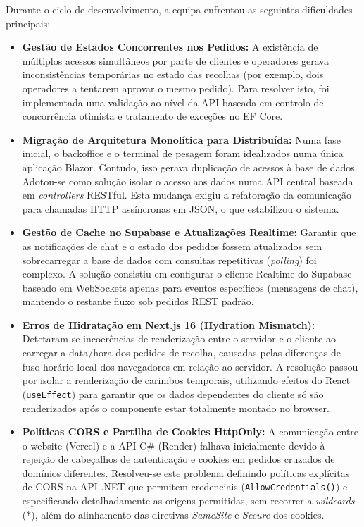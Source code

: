 Durante o ciclo de desenvolvimento, a equipa enfrentou as seguintes dificuldades principais:
\begin{itemize}
    \item \textbf{Gestão de Estados Concorrentes nos Pedidos:} A existência de múltiplos acessos simultâneos por parte de clientes e operadores gerava inconsistências temporárias no estado das recolhas (por exemplo, dois operadores a tentarem aprovar o mesmo pedido). Para resolver isto, foi implementada uma validação ao nível da API baseada em controlo de concorrência otimista e tratamento de exceções no EF Core.
    \item \textbf{Migração de Arquitetura Monolítica para Distribuída:} Numa fase inicial, o backoffice e o terminal de pesagem foram idealizados numa única aplicação Blazor. Contudo, isso gerava duplicação de acessos à base de dados. Adotou-se como solução isolar o acesso aos dados numa API central baseada em \textit{controllers} RESTful. Esta mudança exigiu a refatoração da comunicação para chamadas \ac{HTTP} assíncronas em \ac{JSON}, o que estabilizou o sistema.
    \item \textbf{Gestão de Cache no Supabase e Atualizações Realtime:} Garantir que as notificações de chat e o estado dos pedidos fossem atualizados sem sobrecarregar a base de dados com consultas repetitivas (\textit{polling}) foi complexo. A solução consistiu em configurar o cliente Realtime do Supabase baseado em WebSockets apenas para eventos específicos (mensagens de chat), mantendo o restante fluxo sob pedidos REST padrão.
    \item \textbf{Erros de Hidratação em Next.js 16 (Hydration Mismatch):} Detetaram-se incoerências de renderização entre o servidor e o cliente ao carregar a data/hora dos pedidos de recolha, causadas pelas diferenças de fuso horário local dos navegadores em relação ao servidor. A resolução passou por isolar a renderização de carimbos temporais, utilizando efeitos do React (\texttt{useEffect}) para garantir que os dados dependentes do cliente só são renderizados após o componente estar totalmente montado no browser.
    \item \textbf{Políticas \ac{CORS} e Partilha de Cookies HttpOnly:} A comunicação entre o website (Vercel) e a API C\# (Render) falhava inicialmente devido à rejeição de cabeçalhos de autenticação e cookies em pedidos cruzados de domínios diferentes. Resolveu-se este problema definindo políticas explícitas de \ac{CORS} na API .NET que permitem credenciais (\texttt{AllowCredentials()}) e especificando detalhadamente as origens permitidas, sem recorrer a \textit{wildcards} (*), além do alinhamento das diretivas \textit{SameSite} e \textit{Secure} dos cookies.

\end{itemize}
